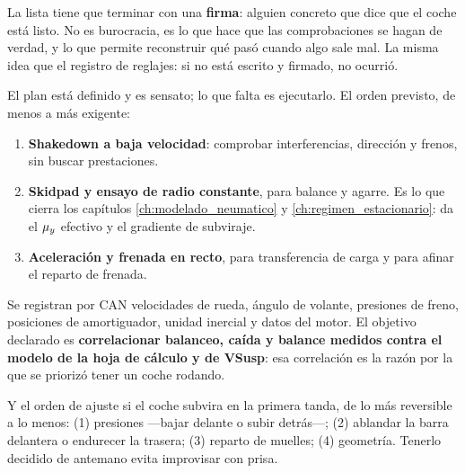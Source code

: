\begin{clave}
La lista tiene que terminar con una \textbf{firma}: alguien concreto que dice
que el coche está listo. No es burocracia, es lo que hace que las
comprobaciones se hagan de verdad, y lo que permite reconstruir qué pasó cuando
algo sale mal. La misma idea que el registro de reglajes: si no está escrito y
firmado, no ocurrió.
\end{clave}


\begin{caso}
El plan está definido y es sensato; lo que falta es ejecutarlo. El orden
previsto, de menos a más exigente:

\begin{enumerate}
  \item \textbf{Shakedown a baja velocidad}: comprobar interferencias,
        dirección y frenos, sin buscar prestaciones.
  \item \textbf{Skidpad y ensayo de radio constante}, para balance y agarre.
        Es lo que cierra los capítulos \ref{ch:modelado_neumatico} y
        \ref{ch:regimen_estacionario}: da el $\mu_y$ efectivo y el gradiente de
        subviraje.
  \item \textbf{Aceleración y frenada en recto}, para transferencia de carga y
        para afinar el reparto de frenada.
\end{enumerate}

Se registran por CAN velocidades de rueda, ángulo de volante, presiones de
freno, posiciones de amortiguador, unidad inercial y datos del motor. El
objetivo declarado es \textbf{correlacionar balanceo, caída y balance medidos
contra el modelo de la hoja de cálculo y de VSusp}: esa correlación es la razón
por la que se priorizó tener un coche rodando.

Y el orden de ajuste si el coche subvira en la primera tanda, de lo más
reversible a lo menos: (1) presiones ---bajar delante o subir detrás---;
(2) ablandar la barra delantera o endurecer la trasera; (3) reparto de muelles;
(4) geometría. Tenerlo decidido de antemano evita improvisar con prisa.

\medskip
{}
\end{caso}

